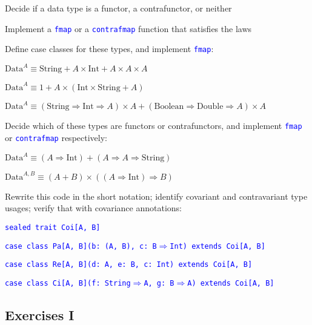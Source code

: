 Decide if a data type is a functor, a contrafunctor, or neither

Implement a \texttt{\textcolor{blue}{\footnotesize{}fmap}} or a \texttt{\textcolor{blue}{\footnotesize{}contrafmap}}
function that satisfies the laws

Define case classes for these types, and implement \texttt{\textcolor{blue}{\footnotesize{}fmap}}:

$\text{Data}^{A}\equiv\text{String}+A\times\text{Int}+A\times A\times A$

$\text{Data}^{A}\equiv1+A\times(\text{Int}\times\text{String}+A)$

$\text{Data}^{A}\equiv\left(\text{String}\Rightarrow\text{Int}\Rightarrow A\right)\times A+\left(\text{Boolean}\Rightarrow\text{Double}\Rightarrow A\right)\times A$

Decide which of these types are functors or contrafunctors, and implement
\texttt{\textcolor{blue}{\footnotesize{}fmap}} or \texttt{\textcolor{blue}{\footnotesize{}contrafmap}}
respectively:

$\text{Data}^{A}\equiv\left(A\Rightarrow\text{Int}\right)+\left(A\Rightarrow A\Rightarrow\text{String}\right)$

$\text{Data}^{A,B}\equiv\left(A+B\right)\times\left(\left(A\Rightarrow\text{Int}\right)\Rightarrow B\right)$

Rewrite this code in the short notation; identify covariant and contravariant
type usages; verify that with covariance annotations:

\texttt{\textcolor{blue}{\footnotesize{}sealed trait Coi{[}A, B{]}}}{\footnotesize\par}

\texttt{\textcolor{blue}{\footnotesize{}case class Pa{[}A, B{]}(b: (A,
B), c: B$\Rightarrow$Int)  extends Coi{[}A, B{]}}}{\footnotesize\par}

\texttt{\textcolor{blue}{\footnotesize{}case class Re{[}A, B{]}(d: A,
e: B, c: Int)    extends Coi{[}A, B{]}}}{\footnotesize\par}

\texttt{\textcolor{blue}{\footnotesize{}case class Ci{[}A, B{]}(f: String$\Rightarrow$A,
g: B$\Rightarrow$A) extends Coi{[}A, B{]}}}{\footnotesize\par}


\subsection{Exercises I}

